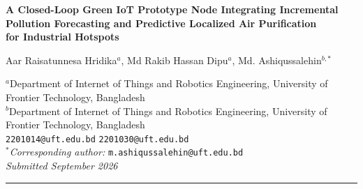 \documentclass[12pt,a4paper]{article}
\begin{document}
\begin{center}
{\LARGE\bfseries A Closed-Loop Green IoT Prototype Node Integrating Incremental\\[3pt]
Pollution Forecasting and Predictive Localized Air Purification\\[3pt]
for Industrial Hotspots}

\vspace{10pt}

{\large Aar Raisatunnesa Hridika$^{a}$, Md Rakib Hassan Dipu$^{a}$, Md. Ashiqussalehin$^{b,*}$}

\vspace{5pt}

{\small
$^{a}$Department of Internet of Things and Robotics Engineering, University of Frontier Technology, Bangladesh\\
$^{b}$Department of Internet of Things and Robotics Engineering, University of Frontier Technology, Bangladesh\\[4pt]
\texttt{2201014@uft.edu.bd} \quad \texttt{2201030@uft.edu.bd}\\[2pt]
$^{*}$\textit{Corresponding author:} \texttt{m.ashiqussalehin@uft.edu.bd}\\[4pt]
\textit{Submitted September 2026}
}
\end{center}
\vspace{3pt}\hrule\vspace{5pt}
\end{document}
